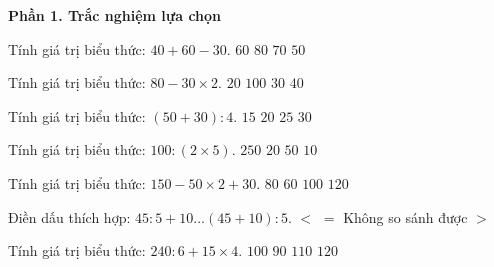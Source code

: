 \textbf{Phần 1. Trắc nghiệm lựa chọn}

\begin{ex} %
Tính giá trị biểu thức: $40 + 60 - 30$.
\choice
{$60$}
{$80$}
{\True $70$}
{$50$}
\end{ex}

\begin{ex} %
Tính giá trị biểu thức: $80 - 30 \times 2$.
\choice
{\True $20$}
{$100$}
{$30$}
{$40$}
\end{ex}

\begin{ex} %
Tính giá trị biểu thức: $(50 + 30) : 4$.
\choice
{$15$}
{\True $20$}
{$25$}
{$30$}
\end{ex}

\begin{ex} %
Tính giá trị biểu thức: $100 : (2 \times 5)$.
\choice
{$250$}
{$20$}
{$50$}
{\True $10$}
\end{ex}

\begin{ex} %
Tính giá trị biểu thức: $150 - 50 \times 2 + 30$.
\choice
{\True $80$}
{$60$}
{$100$}
{$120$}
\end{ex}

\begin{ex} %
Điền dấu thích hợp: $45 : 5 + 10 \dots (45 + 10) : 5$.
\choice
{$<$}
{$=$}
{Không so sánh được}
{\True $>$}
\end{ex}

\begin{ex} %
Tính giá trị biểu thức: $240 : 6 + 15 \times 4$.
\choice
{\True $100$}
{$90$}
{$110$}
{$120$}
\end{ex}

